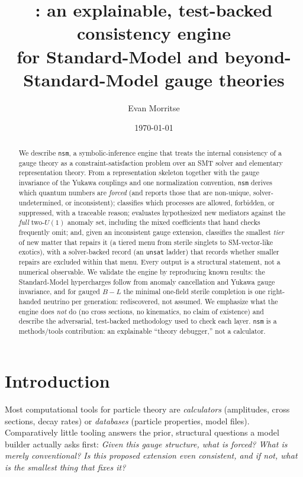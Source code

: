 \documentclass[11pt]{article}
\title{\nsm: an explainable, test-backed consistency engine\\
for Standard-Model and beyond-Standard-Model gauge theories}
\author{Evan Morritse}
\date{\today}
\newcommand{\nsm}{\texttt{nsm}}
\begin{document}
\maketitle

\begin{abstract}
We describe \nsm, a symbolic-inference engine that treats the internal
consistency of a gauge theory as a constraint-satisfaction problem over an SMT
solver and elementary representation theory. From a representation skeleton
together with the gauge invariance of the Yukawa couplings and one normalization
convention, \nsm{} derives which quantum numbers are \emph{forced} (and
reports those that are non-unique, solver-undetermined, or inconsistent); classifies
which processes are allowed, forbidden, or suppressed, with a traceable reason;
evaluates hypothesized new mediators against the \emph{full} two-$U(1)$ anomaly
set, including the mixed coefficients that hand checks frequently omit; and,
given an inconsistent gauge extension, classifies the smallest \emph{tier} of
new matter that repairs it (a tiered menu from sterile singlets to
SM-vector-like exotics), with a solver-backed record (an \texttt{unsat} ladder)
that records whether smaller repairs are excluded within that menu. Every output is a structural statement,
not a numerical observable. We validate the engine by reproducing known results: the
Standard-Model hypercharges follow from anomaly cancellation and Yukawa gauge
invariance, and for gauged $B\!-\!L$ the minimal one-field sterile completion is
one right-handed neutrino per generation: rediscovered, not assumed. We emphasize what the engine does
\emph{not} do (no cross sections, no kinematics, no claim of existence) and
describe the adversarial, test-backed methodology used to check each layer.
\nsm{} is a methods/tools contribution: an explainable ``theory debugger,'' not
a calculator.
\end{abstract}

\section{Introduction}

Most computational tools for particle theory are \emph{calculators} (amplitudes,
cross sections, decay rates) or \emph{databases} (particle properties, model
files). Comparatively little tooling answers the prior, structural questions a
model builder actually asks first: \emph{Given this gauge structure, what is
forced? What is merely conventional? Is this proposed extension even
consistent, and if not, what is the smallest thing that fixes it?}
\end{document}
